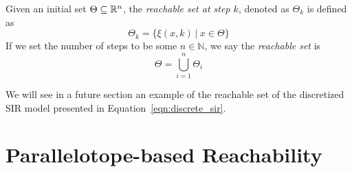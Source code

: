 \begin{definition}
Given an initial set $\Theta \subseteq {\mathbb{R}}^n$, the \emph{reachable set at step $k$}, denoted as $\Theta_k$ is defined as
\begin{equation}
  \Theta_k = \{ \xi(x,k)\: | \: x \in \Theta\}
\label{eq:reachset}
\end{equation}
If we set the number of steps to be some $n \in \mathbb{N}$, we say the \emph{reachable set} is
\begin{equation}
  \Theta = \bigcup_{i=1}^n \Theta_i
\end{equation}
\end{definition}

%
We will see in a future section an example of the reachable set of the discretized SIR model presented in Equation~\ref{eqn:discrete_sir}.


\section{Parallelotope-based Reachability}

